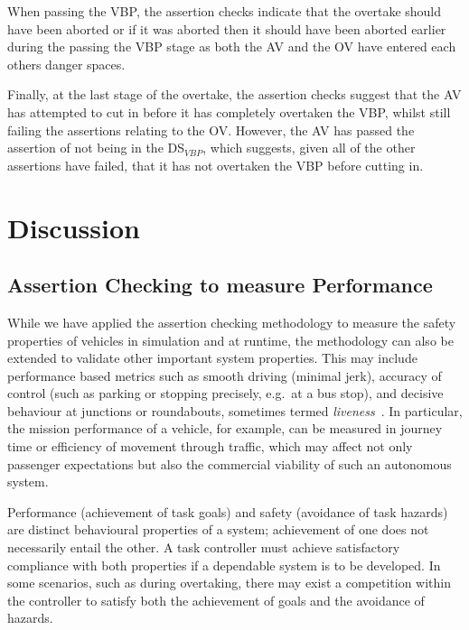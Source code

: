 When passing the VBP, the assertion checks indicate that the overtake should have been aborted or if it was aborted then it should have been aborted earlier during the passing the VBP stage as both the AV and the OV have entered each others danger spaces. 

Finally, at the last stage of the overtake, the assertion checks suggest that the AV has attempted to cut in before it has completely overtaken the VBP, whilst still failing the assertions relating to the OV. However, the AV has passed the assertion of not being in the DS$_{VBP}$, which suggests, given all of the other assertions have failed, that it has not overtaken the VBP before cutting in.



\section{Discussion} \label{discussion}

\subsection{Assertion Checking to measure Performance}
While we have applied the assertion checking methodology to measure the safety properties of vehicles in simulation and at runtime, the methodology can also be extended to validate other important system properties. This may include performance based metrics such as smooth driving (minimal jerk), accuracy of control (such as parking or stopping precisely, e.g.\ at a bus stop), and decisive behaviour at junctions or roundabouts, sometimes termed \emph{liveness}~\cite{kim2014mpc}. In particular, the mission performance of a vehicle, for example, can be measured in journey time or efficiency of movement through traffic, which may affect not only passenger expectations but also the commercial viability of such an autonomous system. 

Performance (achievement of task goals) and safety (avoidance of task hazards) are distinct behavioural properties of a system; achievement of one does not necessarily entail the other. A task controller must achieve satisfactory compliance with both properties if a dependable system is to be developed. In some scenarios, such as during overtaking, there may exist a competition within the controller to satisfy both the achievement of goals and the avoidance of hazards. 

